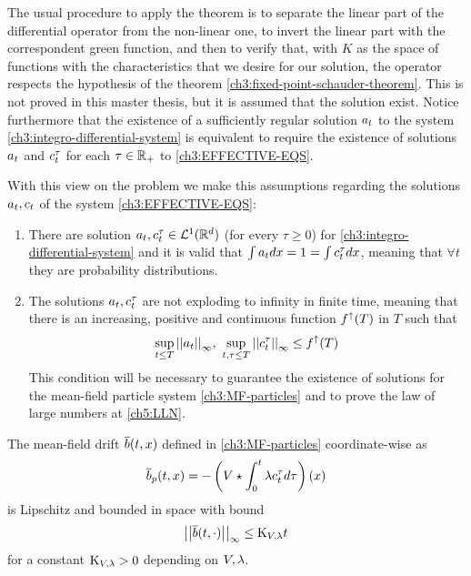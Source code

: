 The usual procedure to apply the theorem is to separate the linear part of the differential operator from the non-linear one, to invert the linear part with the correspondent green function, and then to verify that, with $K$ as the space of functions with the characteristics that we desire for our solution, the operator respects the hypothesis of the theorem \ref{ch3:fixed-point-schauder-theorem}.
This is not proved in this master thesis, but it is assumed that the solution exist.
Notice furthermore that the existence of a sufficiently regular solution $a_t$ to the system \ref{ch3:integro-differential-system} is equivalent to require the existence of solutions $a_t$ and $c_t^\tau$ for each $\tau \in \mathbb{R}_+$ to \ref{ch3:EFFECTIVE-EQS}.

With this view on the problem we make this assumptions regarding the solutions $a_t, c_t$ of the system \ref{ch3:EFFECTIVE-EQS}:
\begin{enumerate}\label{ch3:conditions-on-eff-equ-solutions}
	\item There are solution $a_t,c_t^\tau \in \mathcal{L}^1(\mathbb{R}^d)$ (for every $\tau \geq0$) for \ref{ch3:integro-differential-system} and it is valid that $\int a_t dx = 1= \int c_t^\tau dx$, meaning that $\forall t$ they are probability distributions.
	\item The solutions $a_t,c_t^\tau$ are not exploding to infinity in finite time, meaning that there is an increasing, positive and continuous function $f^\uparrow(T)$ in $T$ such that 
	\begin{equation*}
		\sup_{t\leq T} { \left| \left| a_t \right| \right|_{\infty} },\
		\sup_{t,\tau\leq T} { \left| \left| c_t^\tau \right| \right|_{\infty} } \leq f^\uparrow(T) 
	\end{equation*}
	This condition will be necessary to guarantee the existence of solutions for the mean-field particle system \ref{ch3:MF-particles} and to prove the law of large numbers at \ref{ch5:LLN}.
\end{enumerate}

\begin{lemma}\label{ch3:mfdrift-lips-and-bounded}
	The mean-field drift $\overline{b}(t,x)$ defined in \ref{ch3:MF-particles} coordinate-wise as
	\begin{equation*}
		\overline{b}_p(t,x) = 
		-
		 \left( 
		V \star \int_0^t \lambda c_t^\tau 	d \tau
		\right) (x)
	\end{equation*}
	is Lipschitz and bounded in space with bound
	\begin{equation*}
		{ \left| \left| \overline{b}(t,\cdot) \right| \right|_{\infty} }
		\leq 
		\text{K}_{V, \lambda} t
	\end{equation*}
	for a constant $\text{K}_{V, \lambda} > 0$ depending on $V, \lambda$.
\end{lemma}

